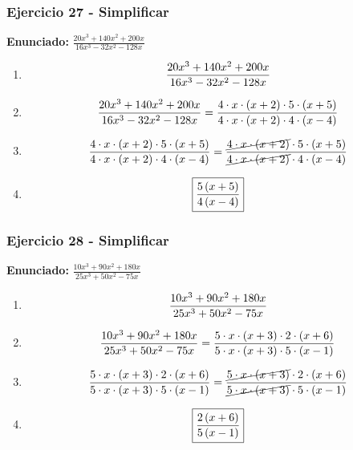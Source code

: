 \documentclass[11pt,a4paper]{article}
\newcommand{\fitmath}[1]{%
\[
\setbox0=\hbox{$\displaystyle #1$}%
\ifdim\wd0>\linewidth
\resizebox{\linewidth}{!}{$\displaystyle #1$}%
\else
#1%
\fi
\]
}
\begin{document}
\vspace{0.12cm}
\subsubsection*{Ejercicio 27 - Simplificar}
\textbf{Enunciado:} $ \frac{20 x^{3} + 140 x^{2} + 200 x}{16 x^{3} - 32 x^{2} - 128 x} $\par
\begin{enumerate}[leftmargin=2em]
\item \fitmath{\frac{20 x^{3} + 140 x^{2} + 200 x}{16 x^{3} - 32 x^{2} - 128 x}}
\item \fitmath{\frac{20 x^{3} + 140 x^{2} + 200 x}{16 x^{3} - 32 x^{2} - 128 x}=\frac{4\cdot x\cdot \left(x + 2\right)\cdot 5\cdot \left(x + 5\right)}{4\cdot x\cdot \left(x + 2\right)\cdot 4\cdot \left(x - 4\right)}}
\item \fitmath{\frac{4\cdot x\cdot \left(x + 2\right)\cdot 5\cdot \left(x + 5\right)}{4\cdot x\cdot \left(x + 2\right)\cdot 4\cdot \left(x - 4\right)}=\frac{\cancel{4\cdot x\cdot \left(x + 2\right)}\cdot 5\cdot \left(x + 5\right)}{\cancel{4\cdot x\cdot \left(x + 2\right)}\cdot 4\cdot \left(x - 4\right)}}
\item \fitmath{\boxed{\frac{5 \left(x + 5\right)}{4 \left(x - 4\right)}}}
\end{enumerate}

\vspace{0.12cm}
\subsubsection*{Ejercicio 28 - Simplificar}
\textbf{Enunciado:} $ \frac{10 x^{3} + 90 x^{2} + 180 x}{25 x^{3} + 50 x^{2} - 75 x} $\par
\begin{enumerate}[leftmargin=2em]
\item \fitmath{\frac{10 x^{3} + 90 x^{2} + 180 x}{25 x^{3} + 50 x^{2} - 75 x}}
\item \fitmath{\frac{10 x^{3} + 90 x^{2} + 180 x}{25 x^{3} + 50 x^{2} - 75 x}=\frac{5\cdot x\cdot \left(x + 3\right)\cdot 2\cdot \left(x + 6\right)}{5\cdot x\cdot \left(x + 3\right)\cdot 5\cdot \left(x - 1\right)}}
\item \fitmath{\frac{5\cdot x\cdot \left(x + 3\right)\cdot 2\cdot \left(x + 6\right)}{5\cdot x\cdot \left(x + 3\right)\cdot 5\cdot \left(x - 1\right)}=\frac{\cancel{5\cdot x\cdot \left(x + 3\right)}\cdot 2\cdot \left(x + 6\right)}{\cancel{5\cdot x\cdot \left(x + 3\right)}\cdot 5\cdot \left(x - 1\right)}}
\item \fitmath{\boxed{\frac{2 \left(x + 6\right)}{5 \left(x - 1\right)}}}
\end{enumerate}
\end{document}

